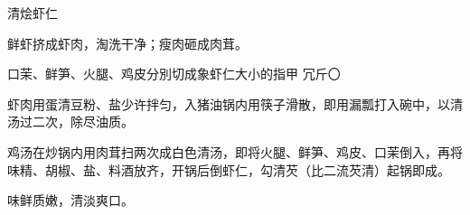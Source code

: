 \begin{recipe}{清烩虾仁}

\ingredients




\cooking

\step 鲜虾挤成虾肉，淘洗干净；瘦肉砸成肉茸。

\step 口茉、鲜笋、火腿、鸡皮分別切成象虾仁大小的指甲 冗斤〇

\step 虾肉用蛋清豆粉、盐少许拌匀，入猪油锅内用筷子滑散，即用漏瓢打入碗中，以清
汤过二次，除尽油质。

\step 鸡汤在炒锅内用肉茸扫两次成白色清汤，即将火腿、鲜笋、鸡皮、口茉倒入，再将
味精、胡椒、盐、料酒放齐，开锅后倒虾仁，勾清芡（比二流芡清）起锅即成。

\notes

味鲜质嫩，清淡爽口。

\end{recipe}

